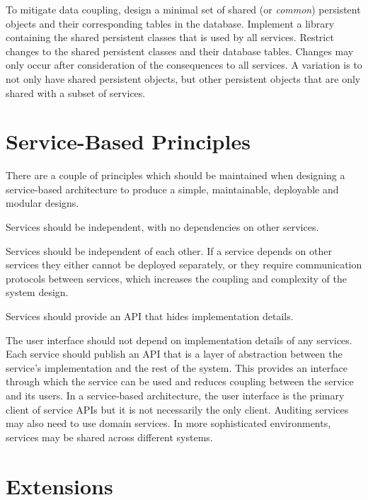 To mitigate data coupling, design a minimal set of shared (or \emph{common}) persistent objects and their corresponding tables in the database.
Implement a library containing the shared persistent classes that is used by all services.
Restrict changes to the shared persistent classes and their database tables.
Changes may only occur after consideration of the consequences to all services.
A variation is to not only have shared persistent objects,
but other persistent objects that are only shared with a subset of services.


\section{Service-Based Principles}
There are a couple of principles which should be maintained when designing a service-based architecture
to produce a simple, maintainable, deployable and modular designs.

\vspace{1mm}
\begin{definition}\label{independent-service}
    Services should be independent, with no dependencies on other services.
\end{definition}

Services should be independent of each other.
If a service depends on other services they either cannot be deployed separately,
or they require communication protocols between services, which increases the coupling and complexity of the system design.

\vspace{1mm}
\begin{definition}\label{api-abstraction}
    Services should provide an API that hides implementation details.
\end{definition}

The user interface should not depend on implementation details of any services.
Each service should publish an API that is a layer of abstraction between the service's implementation and the rest of the system.
This provides an interface through which the service can be used and reduces coupling between the service and its users.
In a service-based architecture, the user interface is the primary client of service APIs but it is not necessarily the only client.
Auditing services may also need to use domain services.
In more sophisticated environments, services may be shared across different systems.


\section{Extensions}

